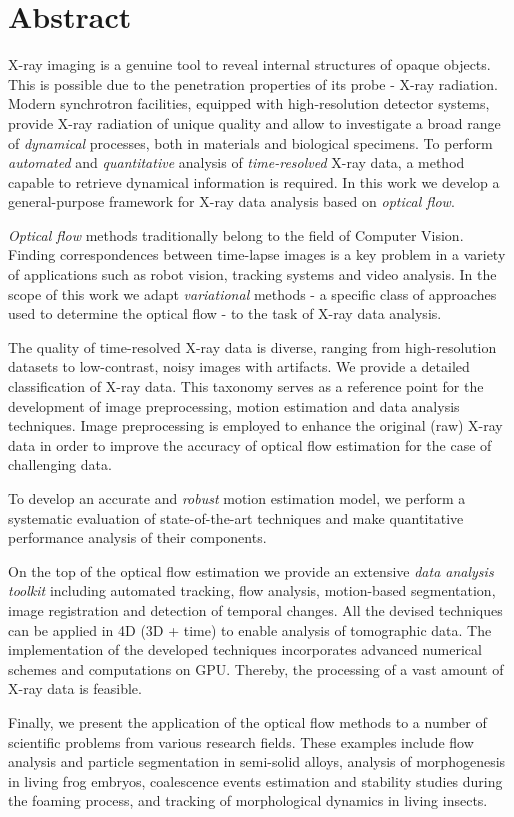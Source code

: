 \chapter*{Abstract}
\thispagestyle{empty}

\begingroup\doublespacing

X-ray imaging is a genuine tool to reveal internal structures of opaque objects. This is possible due to the penetration properties of its probe - X-ray radiation.
Modern synchrotron facilities, equipped with high-resolution detector systems, provide  X-ray radiation of unique quality and allow to investigate a broad range of \textit{dynamical} processes, both in materials and biological specimens.
To perform \textit{automated} and \textit{quantitative} analysis of \textit{time-resolved} X-ray data, a method capable to retrieve dynamical information is required. In this work we develop a general-purpose framework for X-ray data analysis based on \textit{optical flow}.


\textit{Optical flow} methods traditionally belong to the field of Computer Vision. Finding correspondences between time-lapse images is a key problem in a variety of applications such as robot vision, tracking systems and video analysis.
In the scope of this work we adapt  \textit{variational} \opticalflow methods - a specific class of approaches used to determine the optical flow - to the task of X-ray data analysis.


The quality of time-resolved X-ray data is diverse, ranging from high-resolution datasets to low-contrast, noisy images with artifacts. We provide a detailed classification of X-ray data. This taxonomy serves as a reference point for the development of image preprocessing, motion estimation and data analysis techniques. Image preprocessing is employed to enhance the original (raw) X-ray data in order to improve the accuracy of optical flow estimation for the case of challenging data.
 

To develop an accurate and \textit{robust} motion estimation model, we perform a systematic evaluation of state-of-the-art \opticalflow techniques and make quantitative performance analysis of their components. 


On the top of the optical flow estimation we provide an extensive \textit{data analysis toolkit} including automated tracking, flow analysis, motion-based segmentation, image registration and detection of temporal changes. All the devised techniques can be applied in 4D (3D + time) to enable analysis of tomographic data.
The implementation of the developed techniques incorporates advanced numerical schemes and computations on GPU. Thereby, the processing of a vast amount of X-ray data is feasible. 


Finally, we present the application of the optical flow methods to a number of scientific problems from various research fields. These examples include flow analysis and particle segmentation in semi-solid alloys, analysis of morphogenesis in living frog embryos, coalescence events estimation and stability studies during the foaming process, and tracking of morphological dynamics in living insects.


\endgroup




